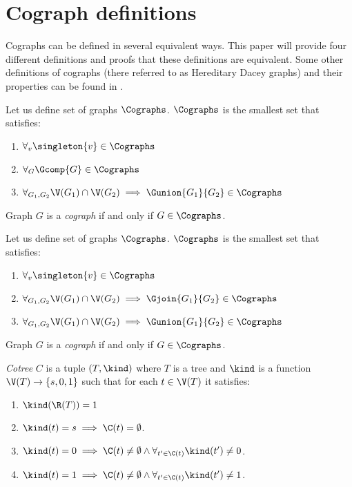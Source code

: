 
\section{Cograph definitions}

Cographs can be defined in several equivalent ways. This paper will provide four different definitions and proofs that these definitions are equivalent. Some other definitions of cographs (there referred to as Hereditary Dacey graphs) and their properties can be found in \cite{sumner}.

\begin{defi}\label{codef1}
    Let us define set of graphs $\Cographs$. $\Cographs$ is the smallest set that satisfies:
    \begin{enumerate}
        \item $\forall_v \singleton{v} \in \Cographs$
        \item $\forall_G \Gcomp{G} \in \Cographs$
        \item $\forall_{G_1, G_2} \V(G_1) \cap \V(G_2) \implies \Gunion{G_1}{G_2} \in \Cographs$
    \end{enumerate}
    Graph $G$ is a \emph{cograph} if and only if $G \in \Cographs$.
\end{defi}
\begin{defi}\label{codef2}
    Let us define set of graphs $\Cographs$. $\Cographs$ is the smallest set that satisfies:
    \begin{enumerate}
        \item $\forall_v \singleton{v} \in \Cographs$
        \item $\forall_{G_1, G_2} \V(G_1) \cap \V(G_2) \implies \Gjoin{G_1}{G_2} \in \Cographs$
        \item $\forall_{G_1, G_2} \V(G_1) \cap \V(G_2) \implies \Gunion{G_1}{G_2} \in \Cographs$
    \end{enumerate}
    Graph $G$ is a \emph{cograph} if and only if $G \in \Cographs$.
\end{defi}

\begin{defi}
    \emph{Cotree} $C$ is a tuple $(T, \kind)$ where $T$ is a tree and $\kind$ is a function $\V(T) \to \{s,0,1\}$ such that for each $t \in \V(T)$ it satisfies:
    \begin{enumerate}
        \item $\kind(\R(T)) = 1$
        \item $\kind(t) = s \implies \C(t) = \emptyset$.
        \item $\kind(t) = 0 \implies \C(t) \neq \emptyset \land \forall_{t' \in \C(t)} \kind(t') \neq 0$.
        \item $\kind(t) = 1 \implies \C(t) \neq \emptyset \land \forall_{t' \in \C(t)} \kind(t') \neq 1$.
    \end{enumerate}
\end{defi}

